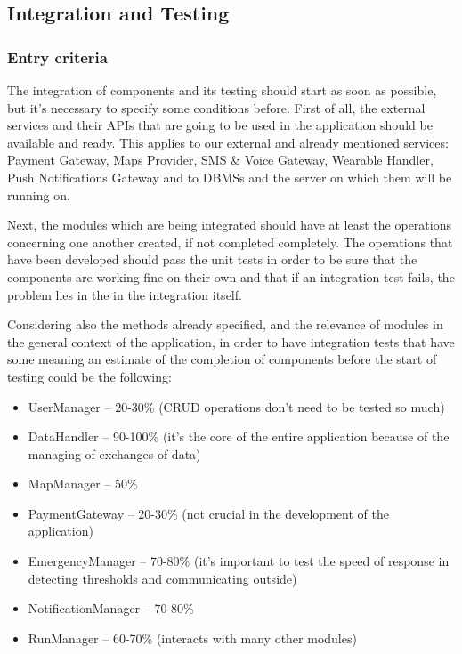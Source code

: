 \subsection{Integration and Testing}
\subsubsection{Entry criteria}
The integration of components and its testing should start as soon as possible, but it's necessary to specify some conditions before. First of all, the external services and their APIs that are going
to be used in the application should be available and ready. This applies to our external and already mentioned services: Payment Gateway, Maps Provider, SMS \& Voice Gateway, Wearable Handler, Push Notifications Gateway and to DBMSs and the server on which them will be running on. \newline

Next, the modules which are being integrated should have at least the operations concerning one another created, if not completed completely. The operations that have been developed should pass the unit tests in order to be sure that the components are working fine on their own and that if an integration test fails, the problem lies in the in the integration itself. \newline

Considering also the methods already specified, and the relevance of modules in the general context of the application, in order to have integration tests that have some meaning an estimate of the completion of components before the start of testing could be the following:
\begin{itemize}
\item UserManager -- 20-30\% (CRUD operations don't need to be tested so much)
\item DataHandler -- 90-100\% (it's the core of the entire application because of the managing of exchanges of data)
\item MapManager -- 50\%
\item PaymentGateway -- 20-30\% (not crucial in the development of the application)
\item EmergencyManager -- 70-80\% (it's important to test the speed of response in detecting thresholds and communicating outside)
\item NotificationManager -- 70-80\%
\item RunManager -- 60-70\% (interacts with many other modules)
\end{itemize}

